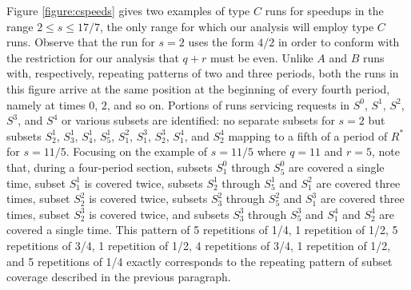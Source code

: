 \documentclass[11pt]{article}
\begin{document}
Figure \ref{figure:cspeeds} gives two examples of type $C$ runs for speedups in the range $2 \leq s \leq 17/7$, the only range for which our analysis will employ type $C$ runs.  Observe that the run for $s = 2$ uses the form $4/2$ in order to conform with the restriction for our analysis that $q + r$ must be even.  Unlike $A$ and $B$ runs with, respectively, repeating patterns of two and three periods, both the runs in this figure arrive at the same position at the beginning of every fourth period, namely at times $0$, $2$, and so on.  Portions of runs servicing requests in $S^0$, $S^1$, $S^2$, $S^3$, and $S^4$ or various subsets are identified: no separate subsets for $s = 2$ but subsets $S^1_2$, $S^1_3$, $S^1_4$, $S^1_5$, $S^2_1$, $S^3_1$, $S^3_2$, $S^4_1$, and $S^4_2$ mapping to a fifth of a period of $R^*$ for $s = 11/5$.  Focusing on the example of $s = 11/5$ where $q = 11$ and $r = 5$, note that, during a four-period section, subsets $S^0_1$ through $S^0_5$ are covered a single time, subset $S^1_1$ is covered twice, subsets $S^1_2$ through $S^1_5$ and $S^2_1$ are covered three times, subset $S^2_2$ is covered twice, subsets $S^2_3$ through $S^2_5$ and $S^3_1$ are covered three times, subset $S^3_2$ is covered twice, and subsets $S^3_3$ through $S^3_5$ and $S^4_1$ and $S^4_2$ are covered a single time.  This pattern of 5 repetitions of 1/4, 1 repetition of 1/2, 5 repetitions of 3/4, 1 repetition of 1/2, 4 repetitions of 3/4, 1 repetition of 1/2, and 5 repetitions of 1/4 exactly corresponds to the repeating pattern of subset coverage described in the previous paragraph.
\end{document}
